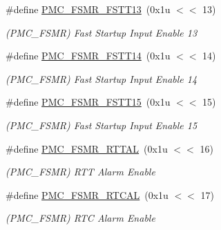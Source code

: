 \begin{DoxyCompactItemize}
\mbox{\label{group__SAME70__PMC_ga965c157ebdda78a7ed073b5babd25c33}} 
\#define \mbox{\hyperlink{group__SAME70__PMC_ga965c157ebdda78a7ed073b5babd25c33}{P\+M\+C\+\_\+\+F\+S\+M\+R\+\_\+\+F\+S\+T\+T13}}~(0x1u $<$$<$ 13)
\begin{DoxyCompactList}\small\item\em (P\+M\+C\+\_\+\+F\+S\+MR) Fast Startup Input Enable 13 \end{DoxyCompactList}\item 
\mbox{\label{group__SAME70__PMC_ga105482e512c6b4f25b3f3b94226b173b}} 
\#define \mbox{\hyperlink{group__SAME70__PMC_ga105482e512c6b4f25b3f3b94226b173b}{P\+M\+C\+\_\+\+F\+S\+M\+R\+\_\+\+F\+S\+T\+T14}}~(0x1u $<$$<$ 14)
\begin{DoxyCompactList}\small\item\em (P\+M\+C\+\_\+\+F\+S\+MR) Fast Startup Input Enable 14 \end{DoxyCompactList}\item 
\mbox{\label{group__SAME70__PMC_ga8a3c7b207ee6621a33cd069df0a57575}} 
\#define \mbox{\hyperlink{group__SAME70__PMC_ga8a3c7b207ee6621a33cd069df0a57575}{P\+M\+C\+\_\+\+F\+S\+M\+R\+\_\+\+F\+S\+T\+T15}}~(0x1u $<$$<$ 15)
\begin{DoxyCompactList}\small\item\em (P\+M\+C\+\_\+\+F\+S\+MR) Fast Startup Input Enable 15 \end{DoxyCompactList}\item 
\mbox{\label{group__SAME70__PMC_ga3dbc26d096503b7121ca9e3fa7f94174}} 
\#define \mbox{\hyperlink{group__SAME70__PMC_ga3dbc26d096503b7121ca9e3fa7f94174}{P\+M\+C\+\_\+\+F\+S\+M\+R\+\_\+\+R\+T\+T\+AL}}~(0x1u $<$$<$ 16)
\begin{DoxyCompactList}\small\item\em (P\+M\+C\+\_\+\+F\+S\+MR) R\+TT Alarm Enable \end{DoxyCompactList}\item 
\mbox{\label{group__SAME70__PMC_ga369c2d741e5ae3b191e5c7d37c9c6537}} 
\#define \mbox{\hyperlink{group__SAME70__PMC_ga369c2d741e5ae3b191e5c7d37c9c6537}{P\+M\+C\+\_\+\+F\+S\+M\+R\+\_\+\+R\+T\+C\+AL}}~(0x1u $<$$<$ 17)
\begin{DoxyCompactList}\small\item\em (P\+M\+C\+\_\+\+F\+S\+MR) R\+TC Alarm Enable \end{DoxyCompactList}\item 
$$
\end{DoxyCompactItemize}
